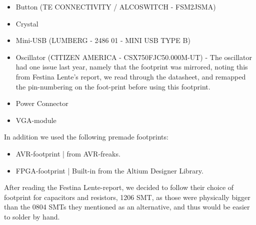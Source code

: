 \begin{itemize}
\item Button (TE CONNECTIVITY / ALCOSWITCH - FSM2JSMA)
\item Crystal
\item Mini-USB (LUMBERG - 2486 01 - MINI USB TYPE B)
\item Oscillator (CITIZEN AMERICA - CSX750FJC50.000M-UT) - 
  The oscillator had one issue last year, namely that the
  footprint was mirrored, noting this from Festina Lente's report, we read
  through the datasheet, and remapped the pin-numbering on the foot-print 
  before using this footprint.
\item Power Connector
\item VGA-module
\end{itemize}

In addition we used the following premade footprints:
\begin{itemize}
\item AVR-footprint | from AVR-freaks.
\item FPGA-footprint | Built-in from the Altium Designer Library.
\end{itemize}

After reading the Festina Lente-report, we decided to follow their
choice of footprint for capacitors and resistors, 1206 SMT, as those were physically bigger
than the 0804 SMTs they mentioned as an alternative, and thus would be easier to solder by hand.
